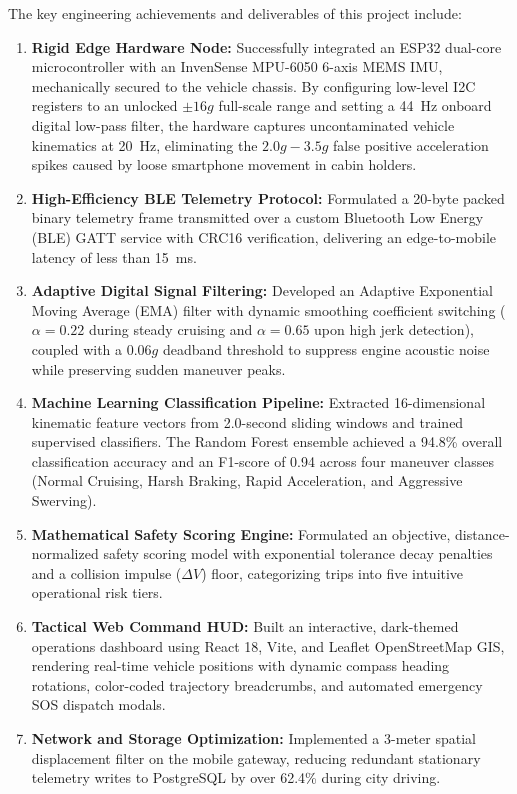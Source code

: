 The key engineering achievements and deliverables of this project include:
\begin{enumerate}
    \item \textbf{Rigid Edge Hardware Node:} Successfully integrated an ESP32 dual-core microcontroller with an InvenSense MPU-6050 6-axis MEMS IMU, mechanically secured to the vehicle chassis. By configuring low-level I2C registers to an unlocked $\pm 16g$ full-scale range and setting a 44~Hz onboard digital low-pass filter, the hardware captures uncontaminated vehicle kinematics at 20~Hz, eliminating the $2.0g - 3.5g$ false positive acceleration spikes caused by loose smartphone movement in cabin holders.
    \item \textbf{High-Efficiency BLE Telemetry Protocol:} Formulated a 20-byte packed binary telemetry frame transmitted over a custom Bluetooth Low Energy (BLE) GATT service with CRC16 verification, delivering an edge-to-mobile latency of less than 15~ms.
    \item \textbf{Adaptive Digital Signal Filtering:} Developed an Adaptive Exponential Moving Average (EMA) filter with dynamic smoothing coefficient switching ($\alpha = 0.22$ during steady cruising and $\alpha = 0.65$ upon high jerk detection), coupled with a $0.06g$ deadband threshold to suppress engine acoustic noise while preserving sudden maneuver peaks.
    \item \textbf{Machine Learning Classification Pipeline:} Extracted 16-dimensional kinematic feature vectors from 2.0-second sliding windows and trained supervised classifiers. The Random Forest ensemble achieved a 94.8\% overall classification accuracy and an F1-score of 0.94 across four maneuver classes (Normal Cruising, Harsh Braking, Rapid Acceleration, and Aggressive Swerving).
    \item \textbf{Mathematical Safety Scoring Engine:} Formulated an objective, distance-normalized safety scoring model with exponential tolerance decay penalties and a collision impulse ($\Delta V$) floor, categorizing trips into five intuitive operational risk tiers.
    \item \textbf{Tactical Web Command HUD:} Built an interactive, dark-themed operations dashboard using React 18, Vite, and Leaflet OpenStreetMap GIS, rendering real-time vehicle positions with dynamic compass heading rotations, color-coded trajectory breadcrumbs, and automated emergency SOS dispatch modals.
    \item \textbf{Network and Storage Optimization:} Implemented a 3-meter spatial displacement filter on the mobile gateway, reducing redundant stationary telemetry writes to PostgreSQL by over 62.4\% during city driving.
\end{enumerate}

